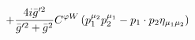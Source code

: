 %
\begin{dmath*}
%
  +  \frac{4 i {\bar g}^{\prime 2}}{{\bar g}^{\prime 2} + {\bar g}{}^2}C^{ \varphi  W} \left(p_1^{\mu_2} p_2^{\mu_1} - p_{1}\nobreak\cdot\nobreak{}p_{2} \eta_{\mu_1 \mu_2}\right)
%
\end{dmath*}
%
